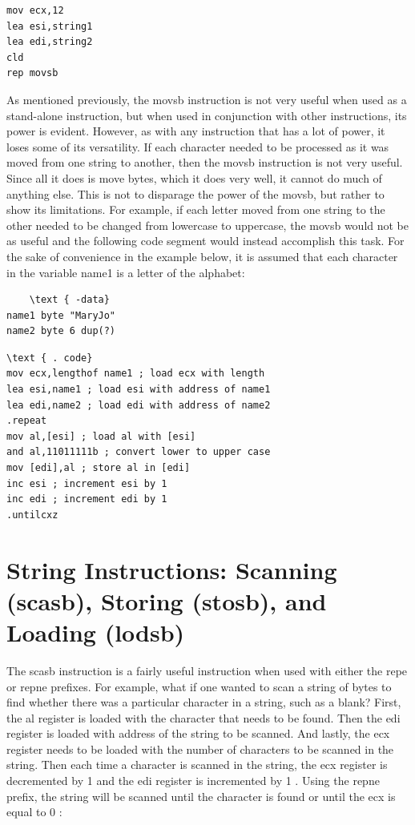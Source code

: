\documentclass[10pt]{book}
\begin{document}
\begin{verbatim}
mov ecx,12
lea esi,string1
lea edi,string2
cld
rep movsb
\end{verbatim}

As mentioned previously, the movsb instruction is not very useful when used as a stand-alone instruction, but when used in conjunction with other instructions, its power is evident. However, as with any instruction that has a lot of power, it loses some of its versatility. If each character needed to be processed as it was moved from one string to another, then the movsb instruction is not very useful. Since all it does is move bytes, which it does very well, it cannot do much of anything else. This is not to disparage the power of the movsb, but rather to show its limitations. For example, if each letter moved from one string to the other needed to be changed from lowercase to uppercase, the movsb would not be as useful and the following code segment would instead accomplish this task. For the sake of convenience in the example below, it is assumed that each character in the variable name1 is a letter of the alphabet:

\begin{verbatim}
    \text { -data}
name1 byte "MaryJo"
name2 byte 6 dup(?)
\end{verbatim}

\begin{verbatim}
\text { . code}
mov ecx,lengthof name1 ; load ecx with length
lea esi,name1 ; load esi with address of name1
lea edi,name2 ; load edi with address of name2
.repeat
mov al,[esi] ; load al with [esi]
and al,11011111b ; convert lower to upper case
mov [edi],al ; store al in [edi]
inc esi ; increment esi by 1
inc edi ; increment edi by 1
.untilcxz
\end{verbatim}

\section{String Instructions: Scanning (scasb), Storing (stosb), and Loading (lodsb)}
The scasb instruction is a fairly useful instruction when used with either the repe or repne prefixes. For example, what if one wanted to scan a string of bytes to find whether there was a particular character in a string, such as a blank? First, the al register is loaded with the character that needs to be found. Then the edi register is loaded with address of the string to be scanned. And lastly, the ecx register needs to be loaded with the number of characters to be scanned in the string. Then each time a character is scanned in the string, the ecx register is decremented by 1 and the edi register is incremented by 1 . Using the repne prefix, the string will be scanned until the character is found or until the ecx is equal to 0 :
\end{document}

